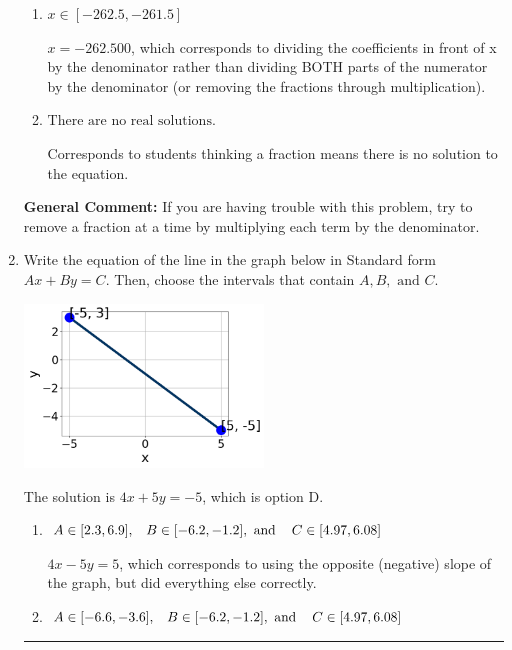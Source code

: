 \documentclass{extbook}[14pt]
\newcommand{\litem}[1]{\item #1

\rule{\textwidth}{0.4pt}}
\begin{document}
\begin{enumerate}
{\begin{enumerate}[label=\Alph*.]
 $x = -13.833$, which corresponds to not distributing the negative in front of the second fraction.
\item \( x \in [-262.5, -261.5] \)

 $x = -262.500$, which corresponds to dividing the coefficients in front of x by the denominator rather than dividing BOTH parts of the numerator by the denominator (or removing the fractions through multiplication).
\item \( \text{There are no real solutions.} \)

Corresponds to students thinking a fraction means there is no solution to the equation.
\end{enumerate}

\textbf{General Comment:} If you are having trouble with this problem, try to remove a fraction at a time by multiplying each term by the denominator.
}
\litem{
Write the equation of the line in the graph below in Standard form $Ax+By=C$. Then, choose the intervals that contain $A, B, \text{ and } C$.

\begin{center}
    \includegraphics[width=0.5\textwidth]{../Figures/linearGraphToStandardA.png}
\end{center}



The solution is \( 4x + 5y = -5 \), which is option D.\begin{enumerate}[label=\Alph*.]
\item \( A \in [2.3, 6.9], \hspace{3mm} B \in [-6.2, -1.2], \text{ and } \hspace{3mm} C \in [4.97, 6.08] \)

 $4x - 5y = 5$, which corresponds to using the opposite (negative) slope of the graph, but did everything else correctly.
\item \( A \in [-6.6, -3.6], \hspace{3mm} B \in [-6.2, -1.2], \text{ and } \hspace{3mm} C \in [4.97, 6.08] \)


\end{enumerate}}
\end{enumerate}
\end{document}
